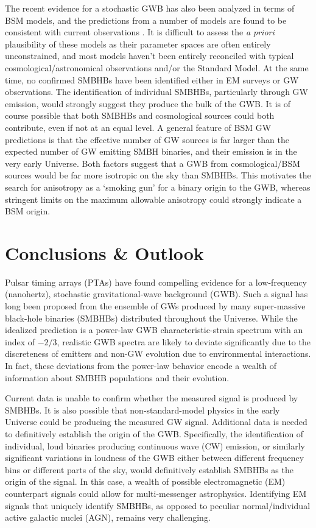 \documentclass[onecolumn,authoryear]{els-mrw}
\begin{document}
The recent evidence for a stochastic GWB has also been analyzed in terms of BSM models, and the predictions from a number of models are found to be consistent with current observations \citep{Afzal+2023}.  It is difficult to assess the \textit{a priori} plausibility of these models as their parameter spaces are often entirely unconstrained, and most models haven't been entirely reconciled with typical cosmological/astronomical observations and/or the Standard Model.  At the same time, no confirmed SMBHBs have been identified either in EM surveys or GW observations.  The identification of individual SMBHBs, particularly through GW emission, would strongly suggest they produce the bulk of the GWB.  It is of course possible that both SMBHBs and cosmological sources could both contribute, even if not at an equal level.  A general feature of BSM GW predictions is that the effective number of GW sources is far larger than the expected number of GW emitting SMBH binaries, and their emission is in the very early Universe.  Both factors suggest that a GWB from cosmological/BSM sources would be far more isotropic on the sky than SMBHBs.  This motivates the search for anisotropy as a `smoking gun' for a binary origin to the GWB, whereas stringent limits on the maximum allowable anisotropy could strongly indicate a BSM origin.


\section*{Conclusions \& Outlook}

Pulsar timing arrays (PTAs) have found compelling evidence for a low-frequency (nanohertz), stochastic gravitational-wave background (GWB).  Such a signal has long been proposed from the ensemble of GWs produced by many super-massive black-hole binaries (SMBHBs) distributed throughout the Universe.  While the idealized prediction is a power-law GWB characteristic-strain spectrum with an index of $-2/3$, realistic GWB spectra are likely to deviate significantly due to the discreteness of emitters and non-GW evolution due to environmental interactions.  In fact, these deviations from the power-law behavior encode a wealth of information about SMBHB populations and their evolution.

Current data is unable to confirm whether the measured signal is produced by SMBHBs.  It is also possible that non-standard-model physics in the early Universe could be producing the measured GW signal.  Additional data is needed to definitively establish the origin of the GWB.  Specifically, the identification of individual, loud binaries producing continuous wave (CW) emission, or similarly significant variations in loudness of the GWB either between different frequency bins or different parts of the sky, would definitively establish SMBHBs as the origin of the signal.  In this case, a wealth of possible electromagnetic (EM) counterpart signals could allow for multi-messenger astrophysics.  Identifying EM signals that uniquely identify SMBHBs, as opposed to peculiar normal/individual active galactic nuclei (AGN), remains very challenging.
\end{document}
